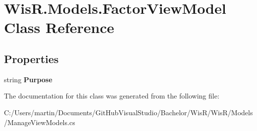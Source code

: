 \hypertarget{class_wis_r_1_1_models_1_1_factor_view_model}{}\section{Wis\+R.\+Models.\+Factor\+View\+Model Class Reference}
\label{class_wis_r_1_1_models_1_1_factor_view_model}
\subsection*{Properties}
\begin{DoxyCompactItemize}
\item 
\hypertarget{class_wis_r_1_1_models_1_1_factor_view_model_a7226e5e66c12bc544b0719721dbf1965}{}string {\bfseries Purpose}\label{class_wis_r_1_1_models_1_1_factor_view_model_a7226e5e66c12bc544b0719721dbf1965}

\end{DoxyCompactItemize}


The documentation for this class was generated from the following file\+:\begin{DoxyCompactItemize}
\item 
C\+:/\+Users/martin/\+Documents/\+Git\+Hub\+Visual\+Studio/\+Bachelor/\+Wis\+R/\+Wis\+R/\+Models/Manage\+View\+Models.\+cs\end{DoxyCompactItemize}
